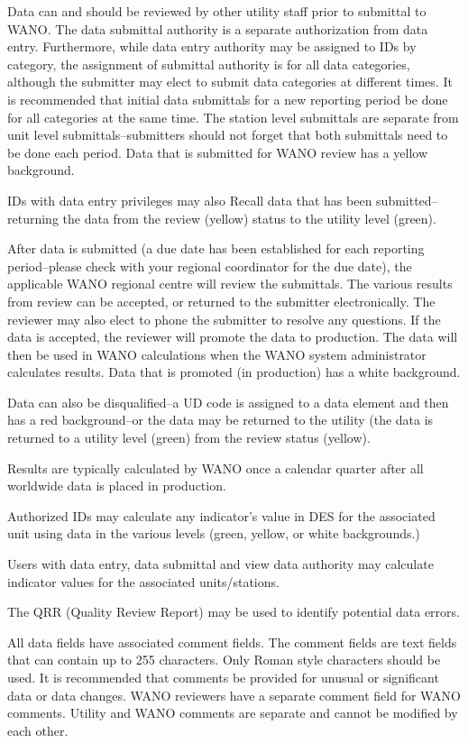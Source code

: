 Data can and should be reviewed by other utility staff prior to submittal to WANO.  The data submittal authority is a separate authorization from data entry.  Furthermore, while data entry authority may be assigned to IDs by category, the assignment of submittal authority is for all data categories, although the submitter may elect to submit data categories at different times.  It is recommended that initial data submittals for a new reporting period be done for all categories at the same time. The station level submittals are separate from unit level submittals--submitters should not forget that both submittals need to be done each period. Data that is submitted for WANO review has a yellow background.

IDs with data entry privileges may also Recall data that has been submitted--returning the data from the review (yellow) status to the utility level (green).

After data is submitted (a due date has been established for each reporting period--please check with your regional coordinator for the due date), the applicable WANO regional centre will review the submittals. The various results from review can be accepted, or returned to the submitter electronically. The reviewer may also elect to phone the submitter to resolve any questions. If the data is accepted, the reviewer will promote the data to production. The data will then be used in WANO calculations when the WANO system administrator calculates results. Data that is promoted (in production) has a white background.

Data can also be disqualified--a UD code is assigned to a data element and then has a red background--or the data may be returned to the utility (the data is returned to a utility level (green) from the review status (yellow).

Results are typically calculated by WANO once a calendar quarter after all worldwide data is placed in production.

Authorized IDs may calculate any indicator’s value in DES for the associated unit using data in the various levels (green, yellow, or white backgrounds.)

Users with data entry, data submittal and view data authority may calculate indicator values for the associated units/stations.

The QRR (Quality Review Report) may be used to identify potential data errors.

All data fields have associated comment fields. The comment fields are
text fields that can contain up to 255 characters. Only Roman style
characters should be used. It is recommended that comments be provided
for unusual or significant data or data changes. WANO reviewers have a
separate comment field for WANO comments. Utility and WANO comments
are separate and cannot be modified by each other.

